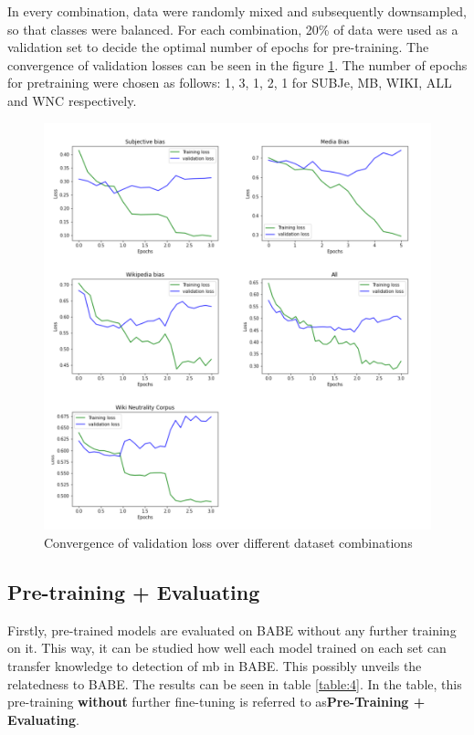 In every combination, data were randomly mixed and subsequently downsampled, so that classes were balanced. For each combination, 20\% of data were used as a validation set to decide the optimal number of epochs for pre-training. The convergence of validation losses can be seen in the figure \ref{fig:all_losses}. The number of epochs for pretraining were chosen as follows: 1, 3, 1, 2, 1 for SUBJe, MB, WIKI, ALL and WNC respectively.
\begin{figure}
  \includegraphics[scale=0.5]{my_modules/multimedia/all_losses.png}
  \caption{Convergence of validation loss over different dataset combinations}
  \label{fig:all_losses}
\end{figure}


\subsection{Pre-training + Evaluating}
Firstly, pre-trained models are evaluated on BABE without any further training on it. This way, it can be studied how well each model trained on each set can transfer knowledge to detection of \gls{mb} in BABE. This possibly unveils the relatedness to BABE. The results can be seen in table \ref{table:4}. In the table, this pre-training \textbf{without} further fine-tuning is referred to as\textbf{Pre-Training + Evaluating}.

